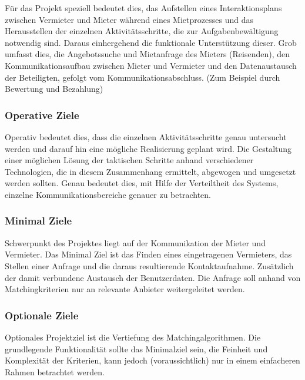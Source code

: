 Für das Projekt speziell bedeutet dies, das Aufstellen eines Interaktionsplans zwischen Vermieter und Mieter während eines Mietprozesses und das Herausstellen der einzelnen Aktivitätsschritte, die zur Aufgabenbewältigung notwendig sind.
Daraus einhergehend die funktionale Unterstützung dieser. Grob umfasst dies, die Angebotssuche und Mietanfrage des Mieters (Reisenden), den Kommunikationsaufbau zwischen Mieter und Vermieter und den Datenaustausch der Beteiligten, gefolgt vom Kommunikationsabschluss. (Zum Beispiel durch Bewertung und Bezahlung)


\subsubsection{Operative Ziele}
Operativ bedeutet dies, dass die einzelnen Aktivitätsschritte genau untersucht werden und darauf hin eine mögliche Realisierung geplant wird. Die Gestaltung einer möglichen Lösung der taktischen Schritte anhand verschiedener Technologien, die in diesem Zusammenhang ermittelt, abgewogen und umgesetzt werden sollten.
Genau bedeutet dies, mit Hilfe der Verteiltheit des Systems, einzelne Kommunikationsbereiche genauer zu betrachten.

\subsubsection{Minimal Ziele}
Schwerpunkt des Projektes liegt auf der Kommunikation der Mieter und Vermieter. Das Minimal Ziel ist das Finden eines eingetragenen Vermieters, das Stellen einer Anfrage und die daraus resultierende Kontaktaufnahme. Zusätzlich der damit verbundene Austausch der Benutzerdaten. Die Anfrage soll anhand von Matchingkriterien nur an relevante Anbieter weitergeleitet werden.


\subsubsection{Optionale Ziele}
Optionales Projektziel ist die Vertiefung des Matchingalgorithmen. Die grundlegende Funktionalität sollte das Minimalziel sein, die Feinheit und Komplexität der Kriterien, kann jedoch (voraussichtlich) nur in einem einfacheren Rahmen betrachtet werden.



